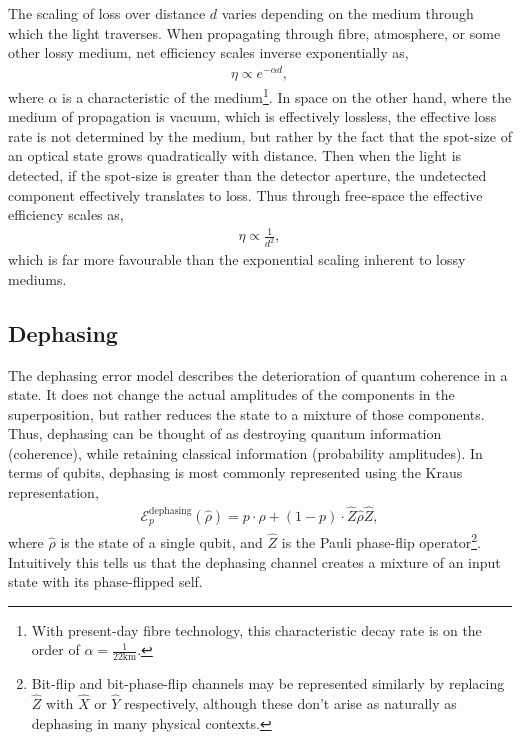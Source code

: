 The scaling of loss over distance $d$ varies depending on the medium through which the light traverses. When propagating through fibre, atmosphere, or some other lossy medium, net efficiency scales inverse exponentially as,
\begin{align}
	\eta\propto e^{-\alpha d},
\end{align}
where $\alpha$ is a characteristic of the medium\footnote{With present-day fibre technology, this characteristic decay rate is on the order of \mbox{$\alpha = \frac{1}{22\mathrm{km}}$}.}. In space on the other hand, where the medium of propagation is vacuum, which is effectively lossless, the effective loss rate is not determined by the medium, but rather by the fact that the spot-size of an optical state grows quadratically with distance. Then when the light is detected, if the spot-size is greater than the detector aperture, the undetected component effectively translates to loss. Thus through free-space the effective efficiency scales as,
\begin{align}
	\eta\propto \frac{1}{d^2},
\end{align}
which is far more favourable than the exponential scaling inherent to lossy mediums.

%
%

\subsection{Dephasing} \label{sec:dephasing_error} 

The dephasing error model describes the deterioration of quantum coherence in a state. It does not change the actual amplitudes of the components in the superposition, but rather reduces the state to a mixture of those components. Thus, dephasing can be thought of as destroying quantum information (coherence), while retaining classical information (probability amplitudes). In terms of qubits, dephasing is most commonly represented using the Kraus representation,
\begin{align} \label{eq:dephasing_channel}
\mathcal{E}_p^\mathrm{dephasing}(\hat\rho) = p\cdot\hat\rho + (1-p)\cdot \hat{Z}\hat\rho\hat{Z},
\end{align}
where $\hat\rho$ is the state of a single qubit, and $\hat{Z}$ is the Pauli phase-flip operator\footnote{Bit-flip and bit-phase-flip channels may be represented similarly by replacing $\hat{Z}$ with $\hat{X}$ or $\hat{Y}$ respectively, although these don't arise as naturally as dephasing in many physical contexts.}. Intuitively this tells us that the dephasing channel creates a mixture of an input state with its phase-flipped self.

